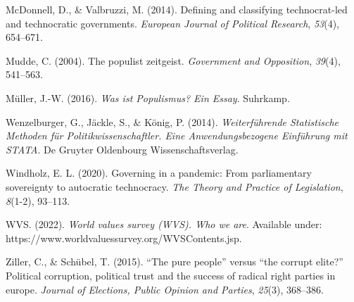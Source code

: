 \documentclass[
  12pt,
  english,
]{article}
\newlength{\cslhangindent}
\newlength{\cslentryspacingunit} %
\newenvironment{CSLReferences}[2] %
 {%
  \setlength{\parindent}{0pt}
  \ifodd #1
  \let\oldpar\par
  \def\par{\hangindent=\cslhangindent\oldpar}
  \fi
  \setlength{\parskip}{#2\cslentryspacingunit}
 }%
 {}
\begin{document}
\begin{CSLReferences}{1}{0}
\leavevmode{}%
McDonnell, D., \& Valbruzzi, M. (2014). Defining and classifying
technocrat-led and technocratic governments. \emph{European Journal of
Political Research}, \emph{53}(4), 654--671.

\leavevmode{}%
Mudde, C. (2004). The populist zeitgeist. \emph{Government and
Opposition}, \emph{39}(4), 541--563.

\leavevmode{}%
Müller, J.-W. (2016). \emph{Was ist {Populismus}? Ein {Essay}}.
Suhrkamp.

\leavevmode{}%
Wenzelburger, G., Jäckle, S., \& König, P. (2014). \emph{{Weiterführende
Statistische Methoden für Politikwissenschaftler. Eine
Anwendungsbezogene Einführung mit STATA}}. De Gruyter Oldenbourg
Wissenschaftsverlag.

\leavevmode{}%
Windholz, E. L. (2020). Governing in a pandemic: From parliamentary
sovereignty to autocratic technocracy. \emph{The Theory and Practice of
Legislation}, \emph{8}(1-2), 93--113.

\leavevmode{}%
WVS. (2022). \emph{World values survey (WVS). Who we are}. Available
under: https://www.worldvaluessurvey.org/WVSContents.jsp.

\leavevmode{}%
Ziller, C., \& Schübel, T. (2015). {``The pure people''} versus {``the
corrupt elite?''} Political corruption, political trust and the success
of radical right parties in europe. \emph{Journal of Elections, Public
Opinion and Parties}, \emph{25}(3), 368--386.

\end{CSLReferences}
\end{document}
